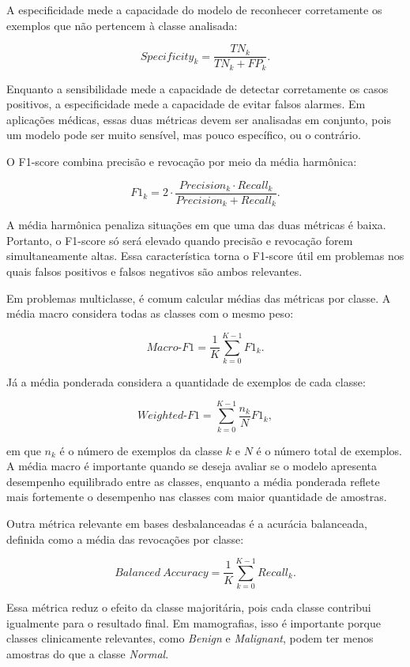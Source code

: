 \documentclass[
    12pt,
    openright,
    oneside,
    a4paper,
    english,
    brazil
]{abntex2}
\begin{document}
A especificidade mede a capacidade do modelo de reconhecer corretamente os exemplos que não pertencem à classe analisada:

\[
Specificity_k =
\frac{TN_k}{TN_k + FP_k}.
\]

Enquanto a sensibilidade mede a capacidade de detectar corretamente os casos positivos, a especificidade mede a capacidade de evitar falsos alarmes. Em aplicações médicas, essas duas métricas devem ser analisadas em conjunto, pois um modelo pode ser muito sensível, mas pouco específico, ou o contrário.

O F1-score combina precisão e revocação por meio da média harmônica:

\[
F1_k =
2 \cdot
\frac{Precision_k \cdot Recall_k}
{Precision_k + Recall_k}.
\]

A média harmônica penaliza situações em que uma das duas métricas é baixa. Portanto, o F1-score só será elevado quando precisão e revocação forem simultaneamente altas. Essa característica torna o F1-score útil em problemas nos quais falsos positivos e falsos negativos são ambos relevantes.

Em problemas multiclasse, é comum calcular médias das métricas por classe. A média macro considera todas as classes com o mesmo peso:

\[
Macro\text{-}F1 =
\frac{1}{K}
\sum_{k=0}^{K-1}
F1_k.
\]

Já a média ponderada considera a quantidade de exemplos de cada classe:

\[
Weighted\text{-}F1 =
\sum_{k=0}^{K-1}
\frac{n_k}{N}
F1_k,
\]

em que \(n_k\) é o número de exemplos da classe \(k\) e \(N\) é o número total de exemplos. A média macro é importante quando se deseja avaliar se o modelo apresenta desempenho equilibrado entre as classes, enquanto a média ponderada reflete mais fortemente o desempenho nas classes com maior quantidade de amostras.

Outra métrica relevante em bases desbalanceadas é a acurácia balanceada, definida como a média das revocações por classe:

\[
Balanced\ Accuracy =
\frac{1}{K}
\sum_{k=0}^{K-1}
Recall_k.
\]

Essa métrica reduz o efeito da classe majoritária, pois cada classe contribui igualmente para o resultado final. Em mamografias, isso é importante porque classes clinicamente relevantes, como \textit{Benign} e \textit{Malignant}, podem ter menos amostras do que a classe \textit{Normal}.
\end{document}
